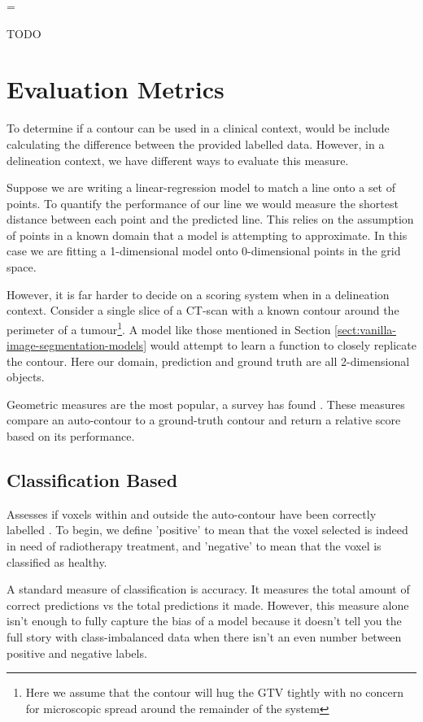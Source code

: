\documentclass[11pt,twoside]{report}
\newenvironment{warning}
  {\par\begin{mdframed}[linewidth=1pt,linecolor=black]%
    \begin{list}{}{\leftmargin=1cm
                   \labelwidth=\leftmargin}\item[\Large\ding{43}]}
  {\end{list}\end{mdframed}\par}
\begin{document}
\begin{warning}
  TODO
\end{warning}

\chapter{Evaluation Metrics}\label{sect:evaluation-metrics}

To determine if a contour can be used in a clinical context, would be include calculating the difference between the provided labelled data. However, in a delineation context, we have different ways to evaluate this measure.

Suppose we are writing a linear-regression model to match a line onto a set of points. To quantify the performance of our line we would measure the shortest distance between each point and the predicted line. This relies on the assumption of points in a known domain that a model is attempting to approximate. In this case we are fitting a 1-dimensional model onto 0-dimensional points in the grid space. 

However, it is far harder to decide on a scoring system when in a delineation context. Consider a single slice of a CT-scan with a known contour around the perimeter of a tumour\footnote{Here we assume that the contour will hug the GTV tightly with no concern for microscopic spread around the remainder of the system}. A model like those mentioned in Section \ref{sect:vanilla-image-segmentation-models} would attempt to learn a function to closely replicate the contour. Here our domain, prediction and ground truth are all 2-dimensional objects. 

Geometric measures are the most popular, a survey has found \cite{review-metrics}. These measures compare an auto-contour to a ground-truth contour and return a relative score based on its performance. 

\section{Classification Based}

Assesses if voxels within and outside the auto-contour have been correctly labelled \cite{review-metrics}. To begin, we define 'positive' to mean that the voxel selected is indeed in need of radiotherapy treatment, and 'negative' to mean that the voxel is classified as healthy.

A standard measure of classification is accuracy. It measures the total amount of correct predictions vs the total predictions it made. However, this measure alone isn't enough to fully capture the bias of a model because it doesn't tell you the full story with class-imbalanced data when there isn't an even number between positive and negative labels.
\end{document}
